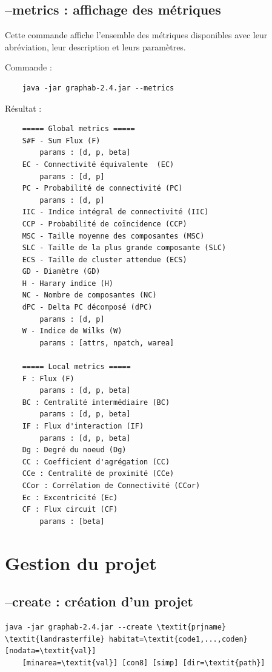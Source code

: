 \documentclass[a4paper,10pt]{report}
\begin{document}
\subsection{--metrics : affichage des métriques}
Cette commande affiche l'ensemble des métriques disponibles avec leur abréviation, leur description et leurs paramètres.

Commande :
\begin{Verbatim}
	java -jar graphab-2.4.jar --metrics
\end{Verbatim}
Résultat :
\begin{Verbatim}
	===== Global metrics =====
	S#F - Sum Flux (F)
		params : [d, p, beta]
	EC - Connectivité équivalente  (EC)
		params : [d, p]
	PC - Probabilité de connectivité (PC)
		params : [d, p]
	IIC - Indice intégral de connectivité (IIC)
	CCP - Probabilité de coïncidence (CCP)
	MSC - Taille moyenne des composantes (MSC)
	SLC - Taille de la plus grande composante (SLC)
	ECS - Taille de cluster attendue (ECS)
	GD - Diamètre (GD)
	H - Harary indice (H)
	NC - Nombre de composantes (NC)
	dPC - Delta PC décomposé (dPC)
		params : [d, p]
	W - Indice de Wilks (W)
		params : [attrs, npatch, warea]
	
	===== Local metrics =====
	F : Flux (F)
		params : [d, p, beta]
	BC : Centralité intermédiaire (BC)
		params : [d, p, beta]
	IF : Flux d'interaction (IF)
		params : [d, p, beta]
	Dg : Degré du noeud (Dg)
	CC : Coefficient d'agrégation (CC)
	CCe : Centralité de proximité (CCe)
	CCor : Corrélation de Connectivité (CCor)
	Ec : Excentricité (Ec)
	CF : Flux circuit (CF)
		params : [beta]

\end{Verbatim}

\section{Gestion du projet}

\subsection{--create : création d'un projet}

\begin{Verbatim}[commandchars=\\\{\}]
java -jar graphab-2.4.jar --create \textit{prjname} \textit{landrasterfile} habitat=\textit{code1,...,coden} [nodata=\textit{val}] 
	[minarea=\textit{val}] [con8] [simp] [dir=\textit{path}]
\end{Verbatim}
\end{document}
